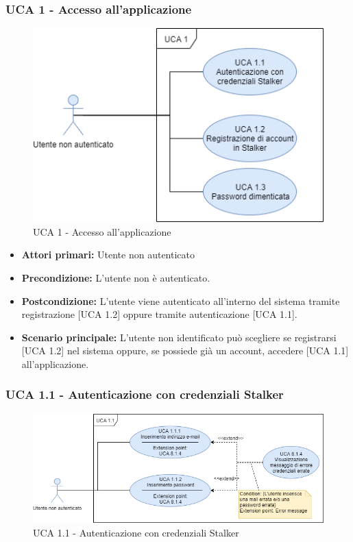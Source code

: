 \subsubsection{UCA 1 - Accesso all'applicazione}%

\begin{figure}[h]
  \centering
    \includegraphics[scale=0.8]{sezioni/UseCase/Immagini/UCA1.png}
  \caption{UCA 1 - Accesso all'applicazione}
\end{figure}

\begin{itemize}
\item \textbf{Attori primari:} Utente non autenticato
\item \textbf{Precondizione:} L'utente non è autenticato.
\item \textbf{Postcondizione:} L'utente viene autenticato all'interno del sistema tramite registrazione [UCA 1.2] oppure tramite autenticazione [UCA 1.1].
\item \textbf{Scenario principale:} L'utente non identificato può scegliere se registrarsi [UCA 1.2] nel sistema oppure, se possiede già un account, accedere [UCA 1.1] all'applicazione. %
\end{itemize}

\subsubsection{UCA 1.1 - Autenticazione con credenziali Stalker}%

\begin{figure}[h]
  \centering
    \includegraphics[scale=0.5, center]{sezioni/UseCase/Immagini/UCA1.1.png}
  \caption{UCA 1.1 - Autenticazione con credenziali Stalker}
\end{figure}

